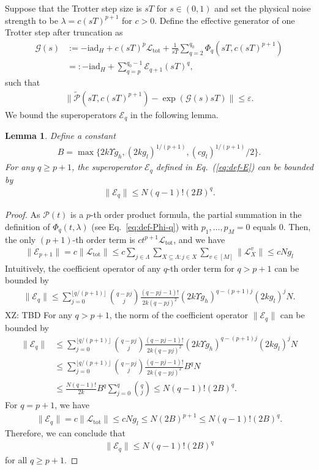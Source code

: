 \documentclass[11pt]{article}
\newtheorem{lemma}{Lemma}
\newcommand{\eq}[1]{(\ref{eq:#1})}
\renewcommand{\i}{\mathrm{i}}
\renewcommand{\L}{\mathcal{L}}
\newcommand{\ad}{\mathrm{ad}}
\renewcommand{\P}{\mathcal{P}}
\newcommand{\tot}{\mathrm{tot}}
\newcommand{\G}{\mathcal{G}}
\newcommand{\E}{\mathcal{E}}
\newcommand{\xz}[1]{{\color{cyan} XZ: #1}}
\begin{document}
Suppose that the Trotter step size is $sT$ for $s\in (0,1)$ and set the physical noise strength to be $\lambda = c(sT)^{p+1}$ for $c > 0$.  Define the effective generator of one Trotter step after truncation as \begin{align}
    \G(s)&:=-\i  \ad_H+c(sT)^p\L_{\tot}+\frac{1}{sT}\sum_{q=2}^{q_0} \Phi_q(sT, c(sT)^{p+1}) \label{eq:def-G}\\
         &=:-\i \ad_H+\sum_{q=p}^{q_0-1} \E_{q+1} (sT)^q, \label{eq:def-E}
\end{align}
such that \begin{align}
    \|\tilde{\P}(sT,c(sT)^{p+1})-\exp(\G(s) sT)\|\le \varepsilon.
\end{align}
We bound the superoperators $\E_{q}$ in the following lemma. 
\begin{lemma}
    Define a constant
    \begin{align}\label{eq:def-B}
        B = \max\{2k\Upsilon g_h, (2kg_l)^{1/(p+1)}, (cg_l)^{1/(p+1)}/2\}.
    \end{align}
    For any $q\ge p+1$, the superoperator $\E_{q}$ defined in Eq.~\eq{def-E} can be bounded by \begin{align}
        \|\E_q\| \le N(q-1)!(2B)^q.
    \end{align}
\end{lemma}
\begin{proof}
As $\P(t)$ is a $p$-th order product formula, the partial summation in the definition of $\Phi_q(t,\lambda)$ (see Eq.~\eqref{eq:def-Phi-q}) with $p_1, \ldots, p_M=0$ equals $0$. Then, the only $(p+1)$-th order term is $ct^{p+1}\L_{\tot}$, and we have \begin{align*}
    \|\E_{p+1}\| = c\|\L_{\tot}\|\le c\sum_{j\in \Lambda}\sum_{X\subseteq \Lambda: j\in X}\sum_{v\in[M]} \|\L_X^v\| \le c Ng_{l}
\end{align*}
Intuitively, the coefficient operator of any $q$-th order term for $q>p+1$ can be bounded by \begin{align}
    \|\E_q\|\le \sum_{j=0}^{\lfloor q/(p+1)\rfloor} \binom{q-pj}{j} \frac{(q-pj-1)!}{2k(q-pj)^2} (2k\Upsilon g_h)^{q-(p+1)j} (2kg_l)^{j }N.
\end{align}
\xz{TBD}
For any  $q>p+1$, the norm of the coefficient operator $\|\E_q\|$ can be bounded by
\begin{align}
\|\E_q\| &\le \sum_{j=0}^{\lfloor q/(p+1)\rfloor} \binom{q-pj}{j} \frac{(q-pj-1)!}{2k(q-pj)^2} (2k\Upsilon g_h)^{q-(p+1)j} (2kg_l)^{j} N \nonumber \\
&\le \sum_{j=0}^{\lfloor q/(p+1)\rfloor} \binom{q-pj}{j} \frac{(q-pj-1)!}{2k(q-pj)^2} B^q N \nonumber \\
&\le \frac{N(q-1)!}{2k}B^q \sum_{j=0}^{q} \binom{q}{j} \le  N(q-1)!(2B)^q.
\end{align}
For $q=p+1$, we have \begin{align*}
    \|\E_q\| = c\|\L_{\tot}\|\le cNg_l\le   N(2B)^{p+1} \le N(q-1)!(2B)^q.
\end{align*}
Therefore, we can conclude that \begin{align}
     \|\E_q\| \le N(q-1)!(2B)^q
\end{align}
for all $q\ge p+1$.
\end{proof}
\end{document}

